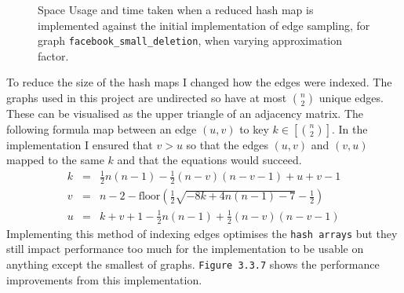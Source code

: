 \documentclass[11pt,twoside,a4paper]{report}
\begin{document}
\begin{figure}[H]
	\label{Figure 19}
	\caption{Space Usage and time taken when a reduced hash map is implemented against the initial implementation of edge sampling, for graph \texttt{facebook\_small\_deletion}, when varying approximation factor.}
\end{figure}

\par To reduce the size of the hash maps I changed how the edges were indexed. The graphs used in this project are undirected so have at most ${n\choose2}$ unique edges. These can be visualised as the upper triangle of an adjacency matrix. The following formula map between an edge $(u,v)$ to key $k\in\left[{n\choose2}\right]$. In the implementation I ensured that $v>u$ so that the edges $(u,v)$ and $(v,u)$ mapped to the same $k$ and that the equations would succeed. %
\[\begin{array}{rcl}
k&=&\frac12n(n-1)-\frac12(n-v)(n-v-1)+u+v-1\\
v&=&n-2-\text{floor}\left(\frac{1}2\sqrt{-8k+4n(n-1)-7}-\frac{1}2\right)\\
u&=&k+v+1-\frac12n(n-1)+\frac12(n-v)(n-v-1)
\end{array}\]
Implementing this method of indexing edges optimises the \texttt{hash arrays} but they still impact performance too much for the implementation to be usable on anything except the smallest of graphs. \texttt{Figure 3.3.7} shows the performance improvements from this implementation.
\end{document}

